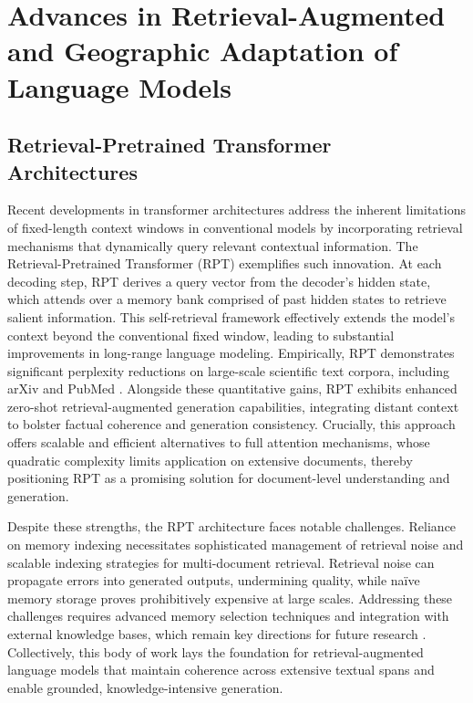 \section{Advances in Retrieval-Augmented and Geographic Adaptation of Language Models}

\subsection{Retrieval-Pretrained Transformer Architectures}

Recent developments in transformer architectures address the inherent limitations of fixed-length context windows in conventional models by incorporating retrieval mechanisms that dynamically query relevant contextual information. The Retrieval-Pretrained Transformer (RPT) exemplifies such innovation. At each decoding step, RPT derives a query vector from the decoder’s hidden state, which attends over a memory bank comprised of past hidden states to retrieve salient information. This self-retrieval framework effectively extends the model’s context beyond the conventional fixed window, leading to substantial improvements in long-range language modeling. Empirically, RPT demonstrates significant perplexity reductions on large-scale scientific text corpora, including arXiv and PubMed \cite{ref29}. Alongside these quantitative gains, RPT exhibits enhanced zero-shot retrieval-augmented generation capabilities, integrating distant context to bolster factual coherence and generation consistency. Crucially, this approach offers scalable and efficient alternatives to full attention mechanisms, whose quadratic complexity limits application on extensive documents, thereby positioning RPT as a promising solution for document-level understanding and generation.

Despite these strengths, the RPT architecture faces notable challenges. Reliance on memory indexing necessitates sophisticated management of retrieval noise and scalable indexing strategies for multi-document retrieval. Retrieval noise can propagate errors into generated outputs, undermining quality, while naïve memory storage proves prohibitively expensive at large scales. Addressing these challenges requires advanced memory selection techniques and integration with external knowledge bases, which remain key directions for future research \cite{ref29}. Collectively, this body of work lays the foundation for retrieval-augmented language models that maintain coherence across extensive textual spans and enable grounded, knowledge-intensive generation.

